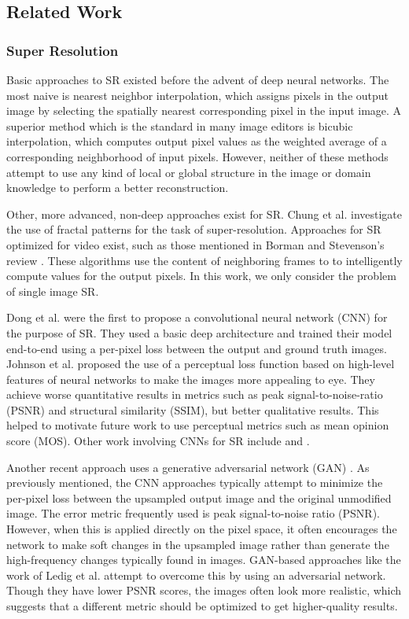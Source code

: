 \documentclass[10pt,twocolumn,letterpaper]{article}
\begin{document}

\subsection{Related Work}
\subsubsection{Super Resolution}
Basic approaches to SR existed before the advent of deep neural networks.  The
most naive is nearest neighbor interpolation, which assigns pixels in the
output image by selecting the spatially nearest corresponding pixel in the
input image. A superior method which is the standard in many image editors is
bicubic interpolation, which computes output pixel values as the weighted
average of a corresponding neighborhood of input pixels. However, neither of
these methods attempt to use any kind of local or global structure in the image
or domain knowledge to perform a better reconstruction.

Other, more advanced, non-deep approaches exist for SR. Chung et al.
\cite{FractalSR} investigate the use of fractal patterns for the task of
super-resolution. Approaches for SR optimized for video exist, such as those
mentioned in Borman and Stevenson's review \cite{VideoSR}. These algorithms use
the content of neighboring frames to to intelligently compute values for the
output pixels. In this work, we only consider the problem of single image SR.

Dong et al. \cite{SRCNN} were the first to propose a convolutional neural
network (CNN) for the purpose of SR.  They used a basic deep architecture and
trained their model end-to-end using a per-pixel loss between the output and
ground truth images. Johnson et al.  \cite{PerceptualLosses} proposed the use
of a perceptual loss function based on high-level features of neural networks
to make the images more appealing to eye. They achieve worse quantitative
results in metrics such as peak signal-to-noise-ratio (PSNR) and structural
similarity (SSIM), but better qualitative results. This helped to motivate
future work to use perceptual metrics such as mean opinion score (MOS). Other
work involving CNNs for SR include \cite{RealtimeCNN} and
\cite{DeeplyRecursive}.

Another recent approach uses a generative adversarial network (GAN) \cite{GAN}.
As previously mentioned, the CNN approaches typically attempt to minimize the
per-pixel loss between the upsampled output image and the original unmodified
image. The error metric frequently used is peak signal-to-noise ratio (PSNR).
However, when this is applied directly on the pixel space, it often
encourages the network to make soft changes in the upsampled image rather than
generate the high-frequency changes typically found in images. GAN-based
approaches like the work of Ledig et al. \cite{SRGAN} attempt to overcome this
by using an adversarial network. Though they have lower PSNR scores, the images
often look more realistic, which suggests that a different metric should be
optimized to get higher-quality results.
\end{document}
